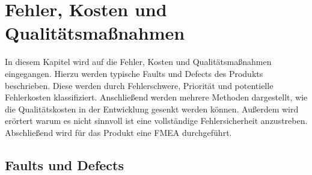 \section{Fehler, Kosten und Qualitätsmaßnahmen}

In diesem Kapitel wird auf die Fehler, Kosten und Qualitätsmaßnahmen eingegangen.
Hierzu werden typische Faults und Defects des Produkts beschrieben.
Diese werden durch Fehlerschwere, Priorität und potentielle Fehlerkosten klassifiziert. 
Anschließend werden mehrere Methoden dargestellt, wie die Qualitätskosten in der Entwicklung gesenkt werden können.
Außerdem wird erörtert warum es nicht sinnvoll ist eine vollständige Fehlersicherheit anzustreben.
Abschließend wird für das Produkt eine \ac{FMEA} durchgeführt.

\subsection{Faults und Defects}

